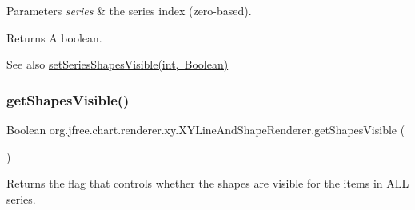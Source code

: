 \begin{DoxyParams}{Parameters}
{\em series} & the series index (zero-\/based).\\
\hline
\end{DoxyParams}
\begin{DoxyReturn}{Returns}
A boolean.
\end{DoxyReturn}
\begin{DoxySeeAlso}{See also}
\mbox{\hyperlink{classorg_1_1jfree_1_1chart_1_1renderer_1_1xy_1_1_x_y_line_and_shape_renderer_a52a7cf419f31dc7824110cf4ed4f1597}{set\+Series\+Shapes\+Visible(int, Boolean)}} 
\end{DoxySeeAlso}
\mbox{\label{classorg_1_1jfree_1_1chart_1_1renderer_1_1xy_1_1_x_y_line_and_shape_renderer_a25d79c5f041107df31533fbc2b9f6d62}} 
\subsubsection{\texorpdfstring{get\+Shapes\+Visible()}{getShapesVisible()}}
{\footnotesize\ttfamily Boolean org.\+jfree.\+chart.\+renderer.\+xy.\+X\+Y\+Line\+And\+Shape\+Renderer.\+get\+Shapes\+Visible (\begin{DoxyParamCaption}{ }\end{DoxyParamCaption})}

Returns the flag that controls whether the shapes are visible for the items in A\+LL series.


